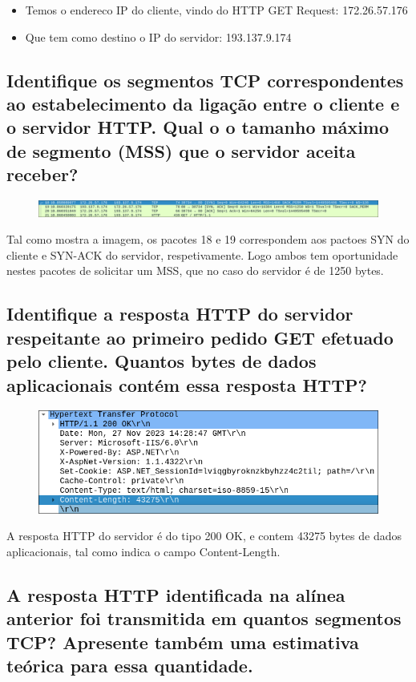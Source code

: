 \documentclass{article}
\begin{document}
\begin{itemize}
    \item Temos o endereco IP do cliente, vindo do HTTP GET Request: 172.26.57.176
    \item Que tem como destino o IP do servidor: 193.137.9.174
\end{itemize}

\subsection{Identifique os segmentos TCP correspondentes ao estabelecimento da ligação entre o cliente e o servidor
HTTP. Qual o o tamanho máximo de segmento (MSS) que o servidor aceita receber?}

\begin{figure}[h!]
    \centering
    \includegraphics[width=1\linewidth]{images/mss.png}
\end{figure}

Tal como mostra a imagem, os pacotes 18 e 19 correspondem aos pactoes SYN do cliente e SYN-ACK do servidor, respetivamente.
Logo ambos tem oportunidade nestes pacotes de solicitar um MSS, que no caso do servidor é de 1250 bytes.

\subsection{Identifique a resposta HTTP do servidor respeitante ao primeiro pedido GET efetuado pelo cliente.
Quantos bytes de dados aplicacionais contém essa resposta HTTP?}

\begin{figure}[h!]
    \centering
    \includegraphics[width=0.5\linewidth]{images/ok.png}
\end{figure}

A resposta HTTP do servidor é do tipo 200 OK, e contem 43275 bytes de dados aplicacionais, tal como indica o campo Content-Length.

\subsection{A resposta HTTP identificada na alínea anterior foi transmitida em quantos segmentos TCP? Apresente
também uma estimativa teórica para essa quantidade.}
\end{document}
